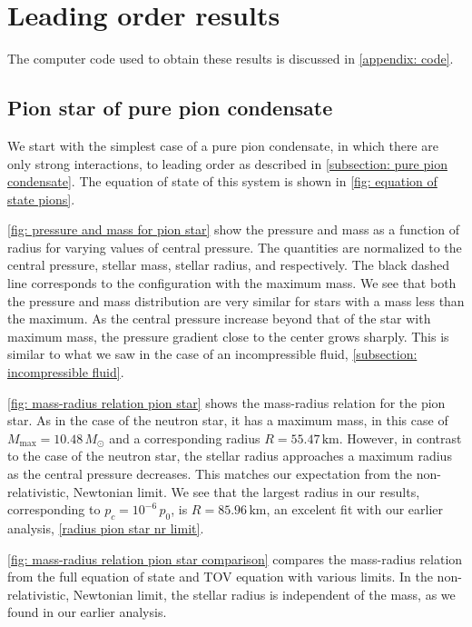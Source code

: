 \section{Leading order results}

The computer code used to obtain these results is discussed in \autoref{appendix: code}.



\subsection{Pion star of pure pion condensate}

We start with the simplest case of a pure pion condensate, in which there are only strong interactions, to leading order as described in \autoref{subsection: pure pion condensate}.
The equation of state of this system is shown in \autoref{fig: equation of state pions}.

\autoref{fig: pressure and mass for pion star} show the pressure and mass as a function of radius for varying values of central pressure.
The quantities are normalized to the central pressure, stellar mass, stellar radius, and respectively.
The black dashed line corresponds to the configuration with the maximum mass.
We see that both the pressure and mass distribution are very similar for stars with a mass less than the maximum.
As the central pressure increase beyond that of the star with maximum mass, the pressure gradient close to the center grows sharply.
This is similar to what we saw in the case of an incompressible fluid, \autoref{subsection: incompressible fluid}.

\autoref{fig: mass-radius relation pion star} shows the mass-radius relation for the pion star.
As in the case of the neutron star, it has a maximum mass, in this case of $M_\text{max} = 10.48\, M_\odot$ and a corresponding radius $R = 55.47\,\text{km}$.
However, in contrast to the case of the neutron star, the stellar radius approaches a maximum radius as the central pressure decreases.
This matches our expectation from the non-relativistic, Newtonian limit.
We see that the largest radius in our results, corresponding to  $p_c = 10^{-6} \, p_0$, is $R = 85.96 \, \text{km}$, an excelent fit with our earlier analysis, \autoref{radius pion star nr limit}.

\autoref{fig: mass-radius relation pion star comparison} compares the mass-radius relation from the full equation of state and TOV equation with various limits.
In the non-relativistic, Newtonian limit, the stellar radius is independent of the mass, as we found in our earlier analysis.


